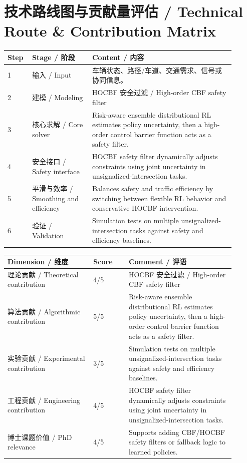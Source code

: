 \documentclass[UTF8,a4paper,11pt,fontset=fandol]{ctexart}
\begin{document}
\section{技术路线图与贡献量评估 / Technical Route \& Contribution Matrix}
\begin{longtable}{p{0.08\linewidth}p{0.24\linewidth}p{0.58\linewidth}}
\toprule
Step & Stage / 阶段 & Content / 内容\\
\midrule
1 & 输入 / Input & 车辆状态、路径/车道、交通需求、信号或协同信息。 \\
2 & 建模 / Modeling & HOCBF 安全过滤 / High-order CBF safety filter \\
3 & 核心求解 / Core solver & Risk-aware ensemble distributional RL estimates policy uncertainty, then a high-order control barrier function acts as a safety filter. \\
4 & 安全接口 / Safety interface & HOCBF safety filter dynamically adjusts constraints using joint uncertainty in unsignalized-intersection tasks. \\
5 & 平滑与效率 / Smoothing and efficiency & Balances safety and traffic efficiency by switching between flexible RL behavior and conservative HOCBF intervention. \\
6 & 验证 / Validation & Simulation tests on multiple unsignalized-intersection tasks against safety and efficiency baselines. \\
\bottomrule
\end{longtable}

\begin{longtable}{p{0.34\linewidth}p{0.14\linewidth}p{0.42\linewidth}}
\toprule
Dimension / 维度 & Score & Comment / 评语\\
\midrule
理论贡献 / Theoretical contribution & 4/5 & HOCBF 安全过滤 / High-order CBF safety filter \\
算法贡献 / Algorithmic contribution & 5/5 & Risk-aware ensemble distributional RL estimates policy uncertainty, then a high-order control barrier function acts as a safety filter. \\
实验贡献 / Experimental contribution & 3/5 & Simulation tests on multiple unsignalized-intersection tasks against safety and efficiency baselines. \\
工程贡献 / Engineering contribution & 4/5 & HOCBF safety filter dynamically adjusts constraints using joint uncertainty in unsignalized-intersection tasks. \\
博士课题价值 / PhD relevance & 4/5 & Supports adding CBF/HOCBF safety filters or fallback logic to learned policies. \\
\bottomrule
\end{longtable}
\end{document}
